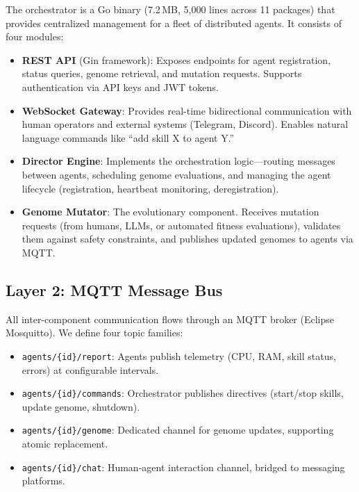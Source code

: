 \documentclass{article}
\newcommand{\topic}[1]{\texttt{#1}}
\begin{document}
The orchestrator is a Go binary (7.2\,MB, 5,000 lines across 11 packages) that provides centralized management for a fleet of distributed agents. It consists of four modules:

\begin{itemize}[leftmargin=*]
    \item \textbf{REST API} (Gin framework): Exposes endpoints for agent registration, status queries, genome retrieval, and mutation requests. Supports authentication via API keys and JWT tokens.
    
    \item \textbf{WebSocket Gateway}: Provides real-time bidirectional communication with human operators and external systems (Telegram, Discord). Enables natural language commands like ``add skill X to agent Y.''
    
    \item \textbf{Director Engine}: Implements the orchestration logic---routing messages between agents, scheduling genome evaluations, and managing the agent lifecycle (registration, heartbeat monitoring, deregistration).
    
    \item \textbf{Genome Mutator}: The evolutionary component. Receives mutation requests (from humans, LLMs, or automated fitness evaluations), validates them against safety constraints, and publishes updated genomes to agents via MQTT.
\end{itemize}

\subsection{Layer 2: MQTT Message Bus}

All inter-component communication flows through an MQTT broker (Eclipse Mosquitto). We define four topic families:

\begin{itemize}[leftmargin=*]
    \item \topic{agents/\{id\}/report}: Agents publish telemetry (CPU, RAM, skill status, errors) at configurable intervals.
    \item \topic{agents/\{id\}/commands}: Orchestrator publishes directives (start/stop skills, update genome, shutdown).
    \item \topic{agents/\{id\}/genome}: Dedicated channel for genome updates, supporting atomic replacement.
    \item \topic{agents/\{id\}/chat}: Human-agent interaction channel, bridged to messaging platforms.
\end{itemize}
\end{document}
